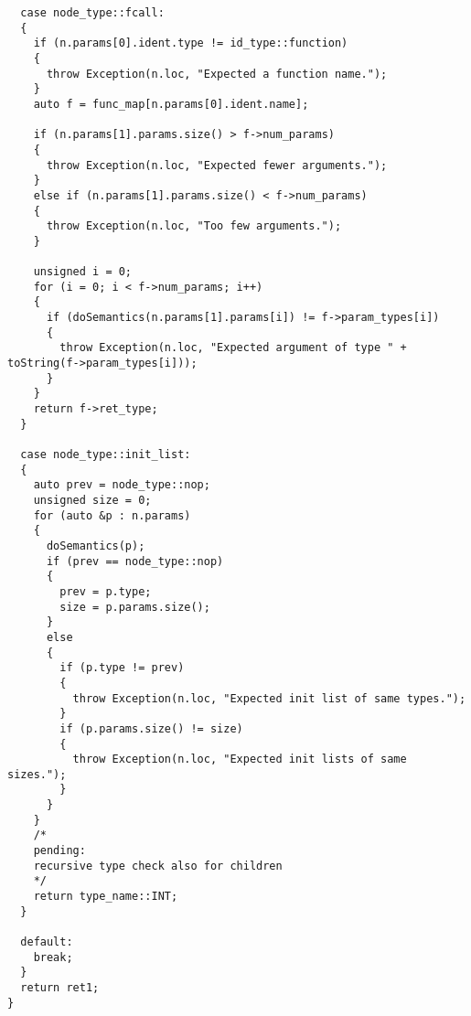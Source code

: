 \documentclass[english,a4paper,12pt]{report}
\begin{document}
\begin{lstlisting}
  case node_type::fcall:
  {
    if (n.params[0].ident.type != id_type::function)
    {
      throw Exception(n.loc, "Expected a function name.");
    }
    auto f = func_map[n.params[0].ident.name];

    if (n.params[1].params.size() > f->num_params)
    {
      throw Exception(n.loc, "Expected fewer arguments.");
    }
    else if (n.params[1].params.size() < f->num_params)
    {
      throw Exception(n.loc, "Too few arguments.");
    }

    unsigned i = 0;
    for (i = 0; i < f->num_params; i++)
    {
      if (doSemantics(n.params[1].params[i]) != f->param_types[i])
      {
        throw Exception(n.loc, "Expected argument of type " + toString(f->param_types[i]));
      }
    }
    return f->ret_type;
  }

  case node_type::init_list:
  {
    auto prev = node_type::nop;
    unsigned size = 0;
    for (auto &p : n.params)
    {
      doSemantics(p);
      if (prev == node_type::nop)
      {
        prev = p.type;
        size = p.params.size();
      }
      else
      {
        if (p.type != prev)
        {
          throw Exception(n.loc, "Expected init list of same types.");
        }
        if (p.params.size() != size)
        {
          throw Exception(n.loc, "Expected init lists of same sizes.");
        }
      }
    }
    /*
    pending:
    recursive type check also for children
    */
    return type_name::INT;
  }

  default:
    break;
  }
  return ret1;
}
\end{lstlisting}
\end{document}

